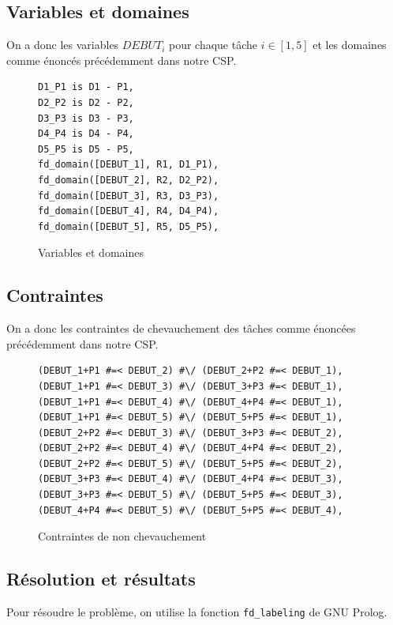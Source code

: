\documentclass{latexPackage/utc-report/utc-report}
\begin{document}
\subsection{Variables et domaines}

On a donc les variables $DEBUT_i$ pour chaque tâche $i \in [1, 5]$ et les domaines comme énoncés précédemment dans notre CSP.

\begin{figure}[h!]
    \begin{verbatim}
D1_P1 is D1 - P1,
D2_P2 is D2 - P2,
D3_P3 is D3 - P3,
D4_P4 is D4 - P4,
D5_P5 is D5 - P5,
fd_domain([DEBUT_1], R1, D1_P1),
fd_domain([DEBUT_2], R2, D2_P2),
fd_domain([DEBUT_3], R3, D3_P3),
fd_domain([DEBUT_4], R4, D4_P4),
fd_domain([DEBUT_5], R5, D5_P5),
    \end{verbatim}
    \caption{Variables et domaines}
\end{figure}

\pagebreak

\subsection{Contraintes}

On a donc les contraintes de chevauchement des tâches comme énoncées précédemment dans notre CSP.

\begin{figure}[h!]
    \begin{verbatim}
(DEBUT_1+P1 #=< DEBUT_2) #\/ (DEBUT_2+P2 #=< DEBUT_1),
(DEBUT_1+P1 #=< DEBUT_3) #\/ (DEBUT_3+P3 #=< DEBUT_1),
(DEBUT_1+P1 #=< DEBUT_4) #\/ (DEBUT_4+P4 #=< DEBUT_1),
(DEBUT_1+P1 #=< DEBUT_5) #\/ (DEBUT_5+P5 #=< DEBUT_1),
(DEBUT_2+P2 #=< DEBUT_3) #\/ (DEBUT_3+P3 #=< DEBUT_2),
(DEBUT_2+P2 #=< DEBUT_4) #\/ (DEBUT_4+P4 #=< DEBUT_2),
(DEBUT_2+P2 #=< DEBUT_5) #\/ (DEBUT_5+P5 #=< DEBUT_2),
(DEBUT_3+P3 #=< DEBUT_4) #\/ (DEBUT_4+P4 #=< DEBUT_3),
(DEBUT_3+P3 #=< DEBUT_5) #\/ (DEBUT_5+P5 #=< DEBUT_3),
(DEBUT_4+P4 #=< DEBUT_5) #\/ (DEBUT_5+P5 #=< DEBUT_4),
    \end{verbatim}
    \caption{Contraintes de non chevauchement}
\end{figure}

\pagebreak

\subsection{Résolution et résultats}

Pour résoudre le problème, on utilise la fonction \texttt{fd\_labeling} de GNU Prolog.
\end{document}
